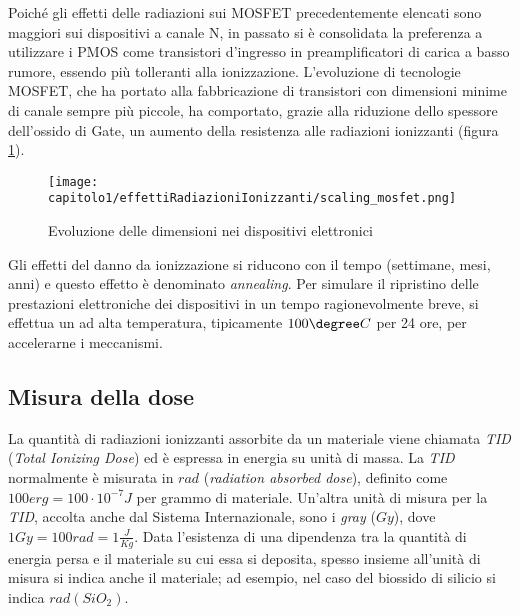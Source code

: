 \vspace*{0.5cm}

Poiché gli effetti delle radiazioni sui MOSFET precedentemente elencati sono maggiori sui dispositivi a canale N, in passato si è consolidata la preferenza a utilizzare i PMOS come transistori d'ingresso in preamplificatori di carica a basso rumore, essendo più tolleranti alla ionizzazione. L'evoluzione di tecnologie MOSFET, che ha portato alla fabbricazione di transistori con dimensioni minime di canale sempre più piccole, ha comportato, grazie alla riduzione dello spessore dell'ossido di Gate, un aumento della resistenza alle radiazioni ionizzanti (figura \ref{fig:scaling_mosfet}).  

\begin{figure}[ht]
	\centering

	\texttt{[image: capitolo1/effettiRadiazioniIonizzanti/scaling\_mosfet.png]}
	\caption[Scaling dei dispositivi elettroni]{Evoluzione delle dimensioni nei dispositivi elettronici \cite{effetti_radiazioni_scaling:Nanoelectronics_and_nanolithography}}
	\label{fig:scaling_mosfet}
\end{figure}


\vspace{0.5cm}

Gli effetti del danno da ionizzazione si riducono con il tempo (settimane, mesi, anni) e questo effetto è denominato \emph{annealing}. Per simulare il ripristino delle prestazioni elettroniche dei dispositivi in un tempo ragionevolmente breve, si effettua  un  ad alta temperatura, tipicamente $100\degree C$ per 24 ore, per accelerarne i meccanismi.

\subsection{Misura della dose}
La quantità di radiazioni ionizzanti assorbite da un materiale viene chiamata \textit{TID} (\textit{Total Ionizing Dose}) ed è espressa in energia su unità di massa.
La \textit{TID} normalmente è misurata in $rad$ (\textit{radiation absorbed dose}), definito come $100 erg  = 100 \cdot 10^{-7} J$ per grammo di materiale. Un'altra unità di misura per la \textit{TID}, accolta anche dal Sistema Internazionale, sono i \textit{gray} ($Gy$), dove $1 Gy = 100rad = 1\frac{J}{Kg}$.
Data l'esistenza di una dipendenza tra la quantità di energia persa e il materiale su cui essa si deposita, spesso insieme all'unità di misura si indica anche il materiale; ad esempio, nel caso del biossido di silicio si indica $rad(SiO_{2})$. 




